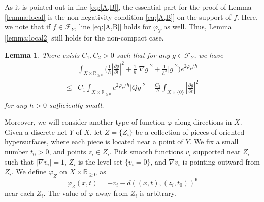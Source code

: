 \documentclass[12pt, reqno]{amsart}
\theoremstyle{plain}%
\newtheorem{lemma}[theorem]{Lemma}
\theoremstyle{definition}
\theoremstyle{remark}
\numberwithin{equation}{section}
\newcommand{\R}{\mathbb{R}}
\begin{document}
As it is pointed out in line \eqref{eq:[A,B]}, the essential part for the proof of Lemma \ref{lemma:local} is the non-negativity condition \eqref{eq:[A,B]} on the support of $f$. Here, we note that if $f\in\mathcal F_Y$, line \eqref{eq:[A,B]}  holds for $\varphi_Y$ as well. Thus, Lemma \ref{lemma:local2} still holds for the non-compact case.
\begin{lemma}\label{lemma:local3}
	There exists $C_1,C_2>0$ such that for any $g\in\mathcal F_Y$, we have
	\begin{equation}\label{eq:local3}
	\begin{split}
			& \int_{X\times\R_{\geq 0}}\Big(\frac 1 h|\frac{\partial g}{\partial t} |^2+\frac 1 h|\nabla g|^2+\frac{1}{h^3}|g|^2\Big)e^{2\varphi_Y/h}\\
			\leq &C_1\int_{X\times\R_{\geq 0}}e^{2\varphi_Y/h}|Qg|^2+\frac{C_2}{h}\int_{X\times\{0\}}|\frac{\partial g}{\partial t}|^2\\	
	\end{split}
	\end{equation}
		for any $h>0$ sufficiently small.
\end{lemma}

Moreover,  we will consider another type of function $\varphi$ along directions in $X$. Given a discrete net $Y$ of $X$, let $Z=\{Z_i\}$ be a collection of pieces of oriented hypersurfaces, where each piece is located near a point of $Y$. We fix a small number $t_0>0$, and points $z_i\in Z_i$. Pick smooth functions $v_i$ supported near $Z_i$ such that $|\nabla v_i|=1$, $Z_i$ is the level set $\{v_i=0\}$, and $\nabla v_i$ is pointing outward from $Z_i$. We define $\varphi_Z$ on $X\times\R_{\geq 0}$ as
$$\varphi_Z(x,t)=-v_i-d((x,t),(z_i,t_0))^6$$
near each $Z_i$. The value of $\varphi$ away from $Z_i$ is arbitrary.
\end{document}
